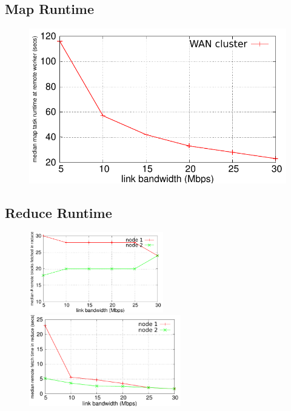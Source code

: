 \subsection{Map Runtime}

\begin{figure}[tb]
\centering\includegraphics[width=\columnwidth]{figs/map-time.pdf}
\vspace{-1.2em}
\caption{}
\label{fig:map-time}
\vspace{.7em}
\end{figure}

\subsection{Reduce Runtime}

\begin{figure}[ht]
	\centering
	\begin{minipage}[b]{0.45\linewidth}
		\includegraphics[width=2.3in]{figs/reduce-blocks.pdf}
		\caption{}
		\label{fig:reduce-blocks}
	\end{minipage}
	\quad
	\begin{minipage}[b]{0.45\linewidth}
		\includegraphics[width=2.6in]{figs/reduce-time.pdf}
		\caption{}
		\label{fig:reduce-time}
	\end{minipage}
\end{figure}



